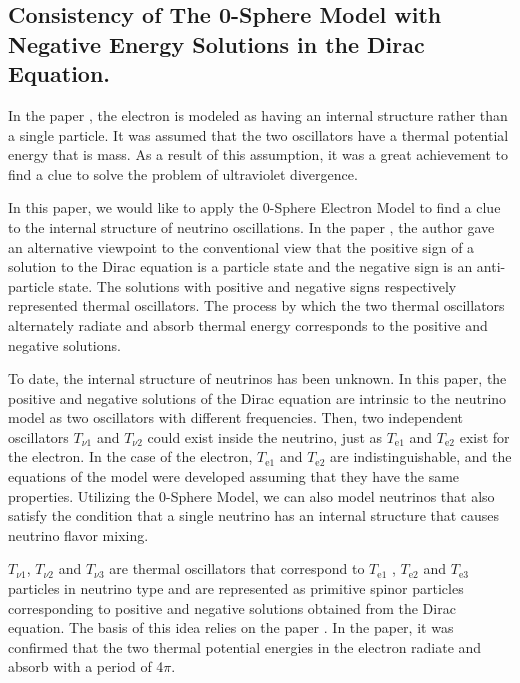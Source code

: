 \documentclass[%
 reprint,
 amsmath,amssymb,
 aps,
]{revtex4-1}
\numberwithin{equation}{section}%
\begin{document}
\subsection{Consistency of The 0-Sphere Model with Negative Energy Solutions in the Dirac Equation.}


In the paper \cite{Hanamura1}, the electron is modeled as having an internal structure rather than a single particle. It was assumed that the two oscillators have a thermal potential energy that is mass. As a result of this assumption, it was a great achievement to find a clue to solve the problem of ultraviolet divergence.

In this paper, we would like to apply the 0-Sphere Electron Model to find a clue to the internal structure of neutrino oscillations. In the paper \cite{Hanamura6}, the author gave an alternative viewpoint to the conventional view that the positive sign of a solution to the Dirac equation is a particle state and the negative sign is an anti-particle state. The solutions with positive and negative signs respectively represented thermal oscillators. The process by which the two thermal oscillators alternately radiate and absorb thermal energy corresponds to the positive and negative solutions.


To date, the internal structure of neutrinos has been unknown. In this paper, the positive and negative solutions of the Dirac equation are intrinsic to the neutrino model as two oscillators with different frequencies. Then, two independent oscillators $T_{\nu \mathrm{1}}$ and $T_{\nu \mathrm{2}}$ could exist inside the neutrino, just as $T_{\mathrm{e1}}$ and $T_{\mathrm{e2}}$ exist for the electron. In the case of the electron, $T_{\mathrm{e1}}$ and $T_{\mathrm{e2}}$ are indistinguishable, and the equations of the model were developed assuming that they have the same properties. Utilizing the 0-Sphere Model, we can also model neutrinos that also satisfy the condition that a single neutrino has an internal structure that causes neutrino flavor mixing.


$T_{\nu \mathrm{1}}$, $T_{\nu \mathrm{2}}$ and $T_{\nu \mathrm{3}}$ are thermal oscillators that correspond to $T_{\mathrm{e1}}$ , $T_{\mathrm{e2}}$ and $T_{\mathrm{e3}}$ particles in neutrino type and are represented as primitive spinor particles corresponding to positive and negative solutions obtained from the Dirac equation. The basis of this idea relies on the paper \cite{Hanamura1}. In the paper, it was confirmed that the two thermal potential energies in the electron radiate and absorb with a period of 4$\pi$. 
\end{document}
